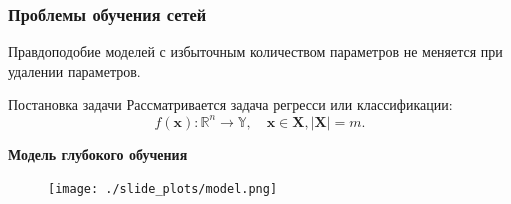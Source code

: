 \documentclass[usenames,dvipsnames,11pt,pdf,utf8,russian,aspectratio=169]{beamer}
\begin{document}
\begin{frame}                                                                                                                                   
\frametitle{Проблемы обучения сетей}                                                                                                          
Правдоподобие моделей с избыточным количеством параметров не меняется при удалении параметров.                                                       
\begin{figure}[h]                                                                                                                               
\centering                                                                                                                                      
\end{figure}                                                                                                                                    
                                                                                                                                                
\end{frame}    



\begin{frame}{ Постановка задачи}
Рассматривается задача регресси или классификации:
\[
    f(\mathbf{x}): \mathbb{R}^n \to \mathbb{Y}, \quad \mathbf{x} \in \mathbf{X}, |\mathbf{X}| = m.
\]

\textbf{Модель глубокого обучения}
\begin{figure}[tbh!]
\texttt{[image: ./slide\_plots/model.png]}
\end{figure}
\end{frame}
\end{document}

